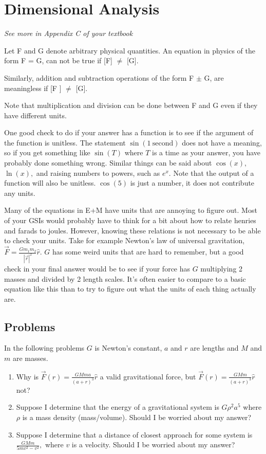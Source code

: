 \documentclass[12pt]{book}
\begin{document}
\pagebreak

\section{Dimensional Analysis}
{\it See more in Appendix C of your textbook}



\noindent Let F and G denote arbitrary physical quantities. An equation in physics of the form F = G, can not be true if [F] $\neq$ [G].

 Similarly, addition and subtraction operations of the form F $\pm$ G, are meaningless if [F ] $\neq$ [G].

 Note that multiplication and division can be done between F and G even if they have different units.

One good check to do if your answer has a function is to see if the argument of the function is unitless. The statement $\sin(1~\mathrm{second})$ does not have a meaning, so if you get something like $\sin(T)$ where $T$ is a time as your answer, you have probably done something wrong. Similar things can be said about $\cos(x),$ $\ln(x),$ and raising numbers to powers, such as $e^x.$ Note that the output of a function will also be unitless. $\cos(5)$ is just a number, it does not contribute any units.

 Many of the equations in E+M have units that are annoying to figure out. Most of your GSIs would probably have to think for a bit about how to relate henries and farads to joules. However, knowing these relations is not necessary to be able to check your units. Take for example Newton's law of universal gravitation, $\vec{F} = \frac{G m_1 m_2}{|\vec{r}|^2}\hat{r}.$ $G$ has some weird units that are hard to remember, but a good check in your final answer would be to see if your force has $G$ multiplying 2 masses and divided by 2 length scales. It's often easier to compare to a basic equation like this than to try to figure out what the units of each thing actually are.

 \pagebreak

\subsection{Problems}
In the following problems $G$ is Newton's constant, $a$ and $r$ are lengths and $M$ and $m$ are masses.
\begin{enumerate}
 \item Why is $\vec{F}(r) = \frac{GMma}{(a+r)^3}\hat{r}$ a valid gravitational force, but $\vec{F}(r) = \frac{GMm}{(a+r)^3}\hat{r}$ not?
 \item Suppose I determine that the energy of a gravitational system is $G\rho^2 a^5$ where $\rho$ is a mass density (mass/volume). Should I be worried about my answer?
 \item Suppose I determine that a distance of closest approach for some system is $\frac{G M m}{5 m v^2-v^2},$ where $v$ is a velocity. Should I be worried about my answer?
\end{enumerate}
\end{document}
